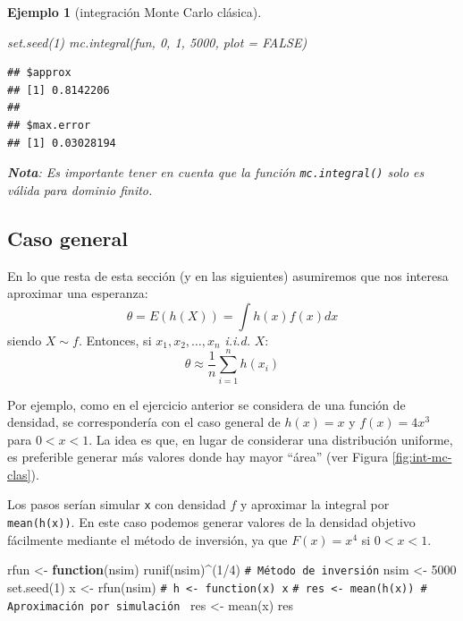 \documentclass[
]{book}
\newenvironment{Shaded}{\begin{snugshade}}{\end{snugshade}}
\newcommand{\AttributeTok}[1]{\textcolor[rgb]{0.77,0.63,0.00}{#1}}
\newcommand{\CommentTok}[1]{\textcolor[rgb]{0.56,0.35,0.01}{\textit{#1}}}
\newcommand{\ConstantTok}[1]{\textcolor[rgb]{0.00,0.00,0.00}{#1}}
\newcommand{\ControlFlowTok}[1]{\textcolor[rgb]{0.13,0.29,0.53}{\textbf{#1}}}
\newcommand{\DecValTok}[1]{\textcolor[rgb]{0.00,0.00,0.81}{#1}}
\newcommand{\FunctionTok}[1]{\textcolor[rgb]{0.00,0.00,0.00}{#1}}
\newcommand{\NormalTok}[1]{#1}
\newcommand{\OtherTok}[1]{\textcolor[rgb]{0.56,0.35,0.01}{#1}}
\newcommand{\SpecialCharTok}[1]{\textcolor[rgb]{0.00,0.00,0.00}{#1}}
\theoremstyle{break}
\newtheorem{example}{Ejemplo}[chapter]
\theoremstyle{nonumberplain}
\renewcommand{\CommentTok}[1]{\textcolor[rgb]{0.41,0.41,0.41}{\texttt{#1}}}
\begin{document}
\begin{example}[integración Monte Carlo clásica]
\begin{Shaded}
\begin{Highlighting}[]
\FunctionTok{set.seed}\NormalTok{(}\DecValTok{1}\NormalTok{)}
\FunctionTok{mc.integral}\NormalTok{(fun, }\DecValTok{0}\NormalTok{, }\DecValTok{1}\NormalTok{, }\DecValTok{5000}\NormalTok{, }\AttributeTok{plot =} \ConstantTok{FALSE}\NormalTok{)}
\end{Highlighting}
\end{Shaded}

\begin{verbatim}
## $approx
## [1] 0.8142206
## 
## $max.error
## [1] 0.03028194
\end{verbatim}

\textbf{Nota}: Es importante tener en cuenta que la función \texttt{mc.integral()} solo es válida para dominio finito.
\end{example}

\hypertarget{caso-general}{%
\subsection{Caso general}\label{caso-general}}

En lo que resta de esta sección (y en las siguientes) asumiremos que nos interesa aproximar una esperanza:
\[\theta = E\left( h\left( X\right) \right) = \int h\left( x\right) f(x)dx\]
siendo \(X\sim f\).
Entonces, si \(x_1,x_2,\ldots ,x_n\) \emph{i.i.d.} \(X\):
\[\theta \approx \frac{1}{n}\sum\limits_{i=1}^nh\left( x_i\right)\]

Por ejemplo, como en el ejercicio anterior se considera de una función de densidad,
se correspondería con el caso general de \(h(x) = x\) y \(f(x) = 4x^3\) para \(0<x<1\).
La idea es que, en lugar de considerar una distribución uniforme,
es preferible generar más valores donde hay mayor ``área'' (ver Figura \ref{fig:int-mc-clas}).

Los pasos serían simular \texttt{x} con densidad \(f\) y aproximar la integral por \texttt{mean(h(x))}.
En este caso podemos generar valores de la densidad objetivo fácilmente mediante el método de inversión, ya que \(F(x) = x^4\) si \(0<x<1\).

\begin{Shaded}
\begin{Highlighting}[]
\NormalTok{rfun }\OtherTok{\textless{}{-}} \ControlFlowTok{function}\NormalTok{(nsim) }\FunctionTok{runif}\NormalTok{(nsim)}\SpecialCharTok{\^{}}\NormalTok{(}\DecValTok{1}\SpecialCharTok{/}\DecValTok{4}\NormalTok{) }\CommentTok{\# Método de inversión}
\NormalTok{nsim }\OtherTok{\textless{}{-}} \DecValTok{5000}
\FunctionTok{set.seed}\NormalTok{(}\DecValTok{1}\NormalTok{)}
\NormalTok{x }\OtherTok{\textless{}{-}} \FunctionTok{rfun}\NormalTok{(nsim)}
\CommentTok{\# h \textless{}{-} function(x) x}
\CommentTok{\# res \textless{}{-} mean(h(x)) \# Aproximación por simulación }
\NormalTok{res }\OtherTok{\textless{}{-}} \FunctionTok{mean}\NormalTok{(x)}
\NormalTok{res}
\end{Highlighting}
\end{Shaded}
\end{document}

